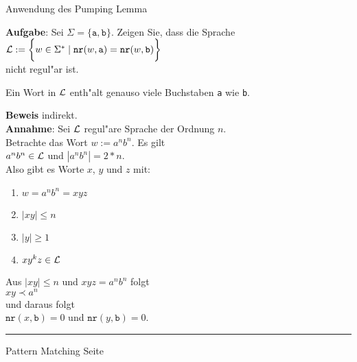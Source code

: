 \begin{slide}{}
\normalsize

\begin{center}
Anwendung des Pumping Lemma
\end{center}
\vspace*{0.5cm}

\footnotesize
\textbf{Aufgabe}: Sei $\Sigma = \{\mathtt{a},\mathtt{b}\}$. Zeigen Sie, dass die Sprache \\[0.3cm]
\hspace*{1.3cm}  ${\cal L} := \bigg\{ w \in \Sigma^* \;|\; \mathtt{nr}(w,\mathtt{a}) = \mathtt{nr}(w,\mathtt{b}) \bigg\}$ \\[0.3cm]
nicht regul"ar ist. 

Ein Wort in ${\cal L}$ enth"alt genauso viele Buchstaben \texttt{a} wie \texttt{b}.

\textbf{Beweis} indirekt. \\[0.3cm]
\textbf{Annahme}: Sei ${\cal L}$ regul"are Sprache der Ordnung $n$.  \\
Betrachte das Wort $w := a^nb^n$.   Es gilt \\[0.3cm]
\hspace*{1.3cm} $a^nb^n \in {\cal L}$ \quad und \quad $|a^nb^n| = 2*n$. \\[0.3cm]
Also gibt es  Worte $x$, $y$ und $z$ mit:
\begin{enumerate}
\item $w = a^nb^n = xyz$
\item $|xy| \leq n$
\item $|y| \geq 1$
\item $xy^kz \in {\cal L}$
\end{enumerate}
Aus \quad $|xy| \leq n$ \quad und \quad $xyz = a^nb^n$ \quad folgt \\[0.3cm]
\hspace*{1.3cm}  $xy \prec a^n$ \\[0.3cm]
und daraus folgt \\[0.3cm]
\hspace*{1.3cm} $\mathtt{nr}(x, \mathtt{b}) = 0$ \quad und \quad $\mathtt{nr}(y, \mathtt{b}) = 0$. \\[0.3cm]

\vspace*{\fill}
\tiny \addtocounter{mypage}{1}
\rule{17cm}{1mm}
Pattern Matching \hspace*{\fill} Seite 
\end{slide}


